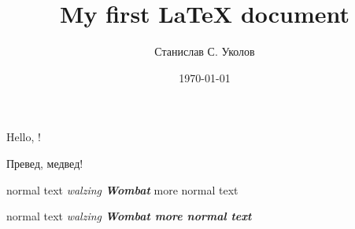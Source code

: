 \documentclass[12pt]{article}
\begin{document}
\title{My first \LaTeX{} document}
\author{Станислав С. Уколов}
\date{\today}
\maketitle

\vfill

Hello, \hfill\LaTeXe{}!

Превед, медвед!

\pagebreak 

normal text {\itshape walzing \bfseries Wombat} more normal text

normal text \bgroup\itshape walzing \bfseries Wombat\egroup{} more normal text
\end{document}
